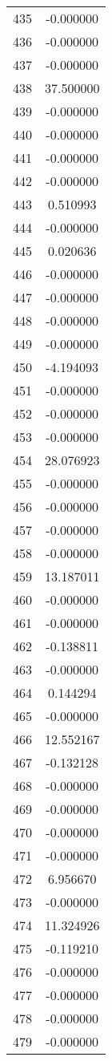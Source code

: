 \documentclass[12pt]{article}
\begin{document}
\begin{longtable}{@{}cc@{}}
435 & -0.000000 \\
436 & -0.000000 \\
437 & -0.000000 \\
438 & 37.500000 \\
439 & -0.000000 \\
440 & -0.000000 \\
441 & -0.000000 \\
442 & -0.000000 \\
443 & 0.510993 \\
444 & -0.000000 \\
445 & 0.020636 \\
446 & -0.000000 \\
447 & -0.000000 \\
448 & -0.000000 \\
449 & -0.000000 \\
450 & -4.194093 \\
451 & -0.000000 \\
452 & -0.000000 \\
453 & -0.000000 \\
454 & 28.076923 \\
455 & -0.000000 \\
456 & -0.000000 \\
457 & -0.000000 \\
458 & -0.000000 \\
459 & 13.187011 \\
460 & -0.000000 \\
461 & -0.000000 \\
462 & -0.138811 \\
463 & -0.000000 \\
464 & 0.144294 \\
465 & -0.000000 \\
466 & 12.552167 \\
467 & -0.132128 \\
468 & -0.000000 \\
469 & -0.000000 \\
470 & -0.000000 \\
471 & -0.000000 \\
472 & 6.956670 \\
473 & -0.000000 \\
474 & 11.324926 \\
475 & -0.119210 \\
476 & -0.000000 \\
477 & -0.000000 \\
478 & -0.000000 \\
479 & -0.000000 \\

\end{longtable}
\end{document}
